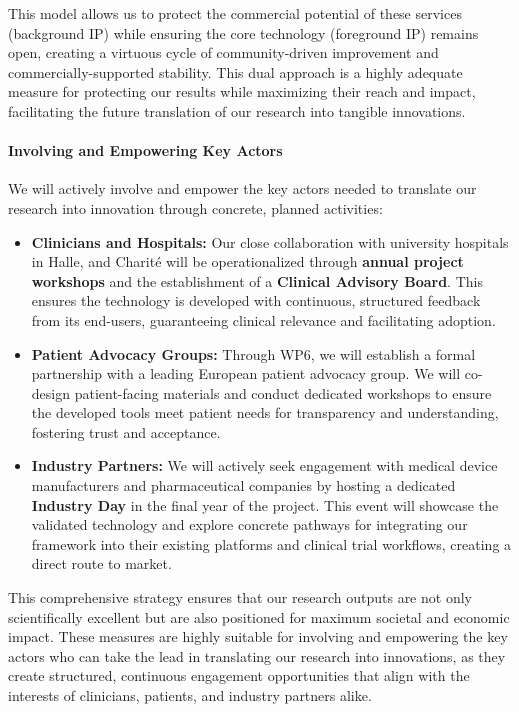 \documentclass[11pt, a4paper]{article}
\begin{document}
This model allows us to protect the commercial potential of these services (background IP) while ensuring the core technology (foreground IP) remains open, creating a virtuous cycle of community-driven improvement and commercially-supported stability. This dual approach is a highly adequate measure for protecting our results while maximizing their reach and impact, facilitating the future translation of our research into tangible innovations.

\paragraph{Involving and Empowering Key Actors}
We will actively involve and empower the key actors needed to translate our research into innovation through concrete, planned activities:
\begin{itemize}
    \item \textbf{Clinicians and Hospitals:} Our close collaboration with university hospitals in Halle, and Charité will be operationalized through \textbf{annual project workshops} and the establishment of a \textbf{Clinical Advisory Board}. This ensures the technology is developed with continuous, structured feedback from its end-users, guaranteeing clinical relevance and facilitating adoption.
    \item \textbf{Patient Advocacy Groups:} Through WP6, we will establish a formal partnership with a leading European patient advocacy group. We will co-design patient-facing materials and conduct dedicated workshops to ensure the developed tools meet patient needs for transparency and understanding, fostering trust and acceptance.
    \item \textbf{Industry Partners:} We will actively seek engagement with medical device manufacturers and pharmaceutical companies by hosting a dedicated \textbf{Industry Day} in the final year of the project. This event will showcase the validated technology and explore concrete pathways for integrating our framework into their existing platforms and clinical trial workflows, creating a direct route to market.
\end{itemize}
This comprehensive strategy ensures that our research outputs are not only scientifically excellent but are also positioned for maximum societal and economic impact. These measures are highly suitable for involving and empowering the key actors who can take the lead in translating our research into innovations, as they create structured, continuous engagement opportunities that align with the interests of clinicians, patients, and industry partners alike.
\end{document}
